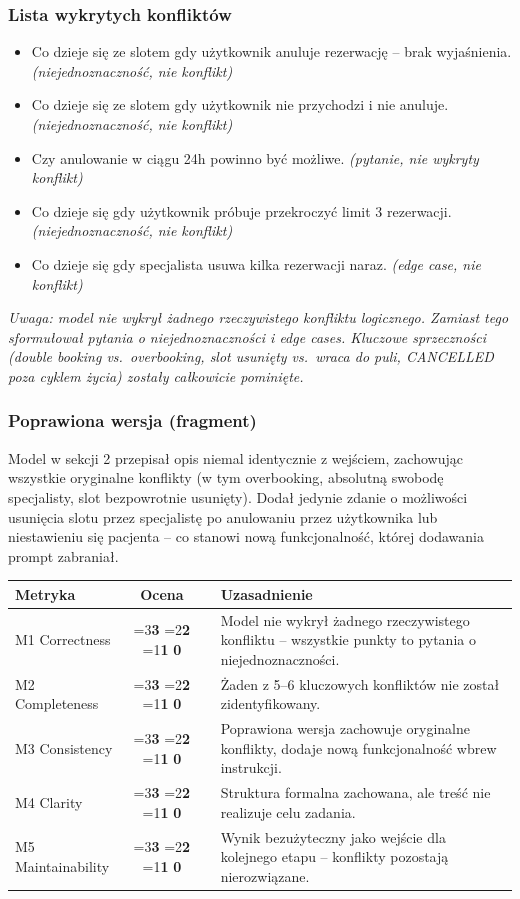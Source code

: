 \documentclass[12pt,a4paper]{article}
\newcommand{\scorebox}[1]{%
  \ifnum#1=3\colorbox{score3}{\textbf{3}}%
  \else\ifnum#1=2\colorbox{score2}{\textbf{2}}%
  \else\ifnum#1=1\colorbox{score1}{\textbf{1}}%
  \else\colorbox{score0}{\textbf{0}}\fi\fi\fi
}
\begin{document}
\subsubsection{Lista wykrytych konfliktów}
\begin{itemize}[leftmargin=1.5em, itemsep=2pt]
  \item Co dzieje się ze slotem gdy użytkownik anuluje rezerwację -- brak wyjaśnienia. \textit{(niejednoznaczność, nie konflikt)}
  \item Co dzieje się ze slotem gdy użytkownik nie przychodzi i nie anuluje. \textit{(niejednoznaczność, nie konflikt)}
  \item Czy anulowanie w ciągu 24h powinno być możliwe. \textit{(pytanie, nie wykryty konflikt)}
  \item Co dzieje się gdy użytkownik próbuje przekroczyć limit 3 rezerwacji. \textit{(niejednoznaczność, nie konflikt)}
  \item Co dzieje się gdy specjalista usuwa kilka rezerwacji naraz. \textit{(edge case, nie konflikt)}
\end{itemize}

\textit{Uwaga: model nie wykrył żadnego rzeczywistego konfliktu logicznego. Zamiast tego sformułował pytania o niejednoznaczności i edge cases. Kluczowe sprzeczności (double booking vs.\ overbooking, slot usunięty vs.\ wraca do puli, CANCELLED poza cyklem życia) zostały całkowicie pominięte.}

\subsubsection{Poprawiona wersja (fragment)}
\small
Model w sekcji 2 przepisał opis niemal identycznie z wejściem, zachowując wszystkie oryginalne konflikty (w tym overbooking, absolutną swobodę specjalisty, slot bezpowrotnie usunięty). Dodał jedynie zdanie o możliwości usunięcia slotu przez specjalistę po anulowaniu przez użytkownika lub niestawieniu się pacjenta -- co stanowi nową funkcjonalność, której dodawania prompt zabraniał.
\normalsize

\vspace{0.5em}
\begin{tabular}{lccl}
\toprule
\textbf{Metryka} & \textbf{Ocena} & & \textbf{Uzasadnienie} \\
\midrule
M1 Correctness    & \scorebox{0} && Model nie wykrył żadnego rzeczywistego konfliktu -- wszystkie punkty to pytania o niejednoznaczności. \\
M2 Completeness   & \scorebox{0} && Żaden z 5--6 kluczowych konfliktów nie został zidentyfikowany. \\
M3 Consistency    & \scorebox{1} && Poprawiona wersja zachowuje oryginalne konflikty, dodaje nową funkcjonalność wbrew instrukcji. \\
M4 Clarity        & \scorebox{1} && Struktura formalna zachowana, ale treść nie realizuje celu zadania. \\
M5 Maintainability & \scorebox{0} && Wynik bezużyteczny jako wejście dla kolejnego etapu -- konflikty pozostają nierozwiązane. \\
\bottomrule
\end{tabular}
\end{document}

